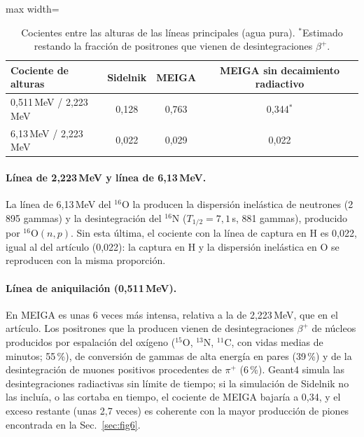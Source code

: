 \documentclass[11pt,a4paper]{article}
\begin{document}
\begin{table}[H]\centering\small\begin{adjustbox}{max width=\linewidth}\begin{tabular}{lccc}\toprule
Cociente de alturas & Sidelnik & MEIGA & MEIGA sin decaimiento radiactivo \\\midrule
0,511\,MeV / 2,223\,MeV & 0,128 & 0,763 & 0,344$^*$ \\
6,13\,MeV / 2,223\,MeV & 0,022 & 0,029 & 0,022 \\
\bottomrule
\end{tabular}\end{adjustbox}\caption{Cocientes entre las alturas de las líneas principales (agua pura). $^*$Estimado restando la fracción de positrones que vienen de desintegraciones $\beta^+$.}\end{table}
\paragraph{Línea de 2,223\,MeV y línea de 6,13\,MeV.} La línea de 6,13\,MeV del $^{16}$O la producen la dispersión inelástica de neutrones (2\,895 gammas)
y la desintegración del $^{16}$N ($T_{1/2}=7{,}1$\,s, 881 gammas), producido por $^{16}$O$(n,p)$. Sin esta última, el cociente con la línea de captura en H
es 0,022, igual al del artículo (0,022): la captura en H y la dispersión inelástica en O se reproducen con la misma proporción.
\paragraph{Línea de aniquilación (0,511\,MeV).} En MEIGA es unas 6 veces más intensa, relativa a la de 2,223\,MeV, que en el artículo.
Los positrones que la producen vienen de desintegraciones $\beta^+$ de núcleos producidos por espalación del oxígeno ($^{15}$O, $^{13}$N, $^{11}$C, con vidas medias de minutos; 55\,\%),
de conversión de gammas de alta energía en pares (39\,\%) y de la desintegración de muones positivos procedentes de $\pi^+$ (6\,\%).
Geant4 simula las desintegraciones radiactivas sin límite de tiempo; si la simulación de Sidelnik no las incluía, o las cortaba en tiempo, el cociente de MEIGA bajaría a 0,34,
y el exceso restante (unas 2,7 veces) es coherente con la mayor producción de piones encontrada en la Sec.~\ref{sec:fig6}.
\end{document}
